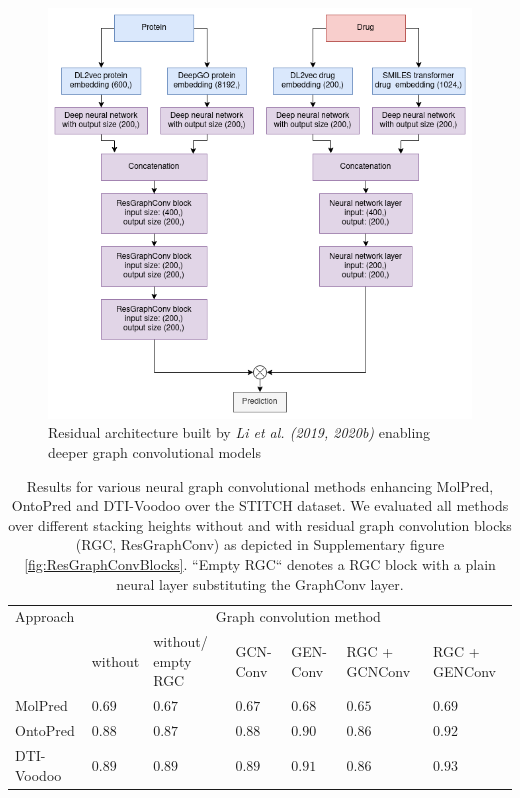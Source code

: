 \documentclass[]{article}
\newcommand{\name}{DTI-Voodoo}
\begin{document}
\clearpage
\begin{figure}[ht]%
	\centerline{\includegraphics[width=1\columnwidth]{../figures/full_model_all_layers.png}}
	\caption{Residual architecture built by \textit{Li et al. (2019, 2020b)} enabling deeper graph convolutional models}
	\label{fig:FullModelAllLayers}
\end{figure}

\clearpage
\begin{table}[ht]
	\centering

	\begin{tabular}{|p{2.0cm}|p{1.1cm}|p{1.2cm}|p{0.8cm}|p{0.8cm}|p{1.2cm}|p{1.2cm}|}
		\hline
		Approach&\multicolumn{6}{c|}{Graph convolution method}\\
		&without&without/ empty RGC&GCN-Conv&GEN-Conv&RGC + GCNConv&RGC + GENConv\\
		\hline
		MolPred & $0.69$ & $0.67$& $0.67$& $0.68$& $0.65$& $0.69$\\
		\hline
		OntoPred &$0.88$ &$0.87$ &$0.88$&$0.90$&$0.86$&$0.92$\\
		\hline
		\name& $0.89$&$0.89$& $0.89$& $0.91$& $0.86$& $\mathbf{0.93}$\\
		\hline
	\end{tabular}
	\caption{\label{tab:Results}Results for various neural graph convolutional methods enhancing MolPred, OntoPred and \name{} over the STITCH dataset. We evaluated all methods over different stacking heights without and with residual graph convolution blocks (RGC, ResGraphConv) as depicted in Supplementary figure \ref{fig:ResGraphConvBlocks}. ``Empty RGC`` denotes a RGC block with a plain neural layer substituting the GraphConv layer.}
\end{table}
\end{document}
